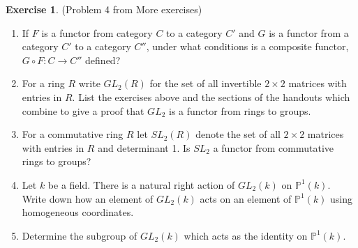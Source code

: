 \documentclass[12pt, psamsfonts]{amsart}
\theoremstyle{definition}
\newtheorem*{exer}{Exercise}
\theoremstyle{remark}
\numberwithin{equation}{section}
\begin{document}
\begin{exer}{(Problem 4 from More exercises)}
  \begin{enumerate}
    \item
      If $F$ is a functor from category $C$ to a category $C'$ and $G$ is a functor from a category $C'$ to a category $C''$, under what conditions is a composite functor, $G \circ F: C \rightarrow C''$ defined?
    \item
      For a ring $R$ write $GL_2(R)$ for the set of all invertible $2 \times 2$ matrices with entries in $R$.
      List the exercises above and the sections of the handouts which combine to give a proof that $GL_2$ is a functor from rings to groups.
    \item
      For a commutative ring $R$ let $SL_2(R)$ denote the set of all $2 \times 2$ matrices with entries in $R$ and determinant 1.
      Is $SL_2$ a functor from commutative rings to groups?
    \item
      Let $k$ be a field.
      There is a natural right action of $GL_2(k)$ on $\mathbb{P}^1(k)$.
      Write down how an element of $GL_2(k)$ acts on an element of $\mathbb{P}^1(k)$ using homogeneous coordinates.
    \item
      Determine the subgroup of $GL_2(k)$ which acts as the identity on $\mathbb{P}^1(k)$.
  \end{enumerate}
\end{exer}
\end{document}
